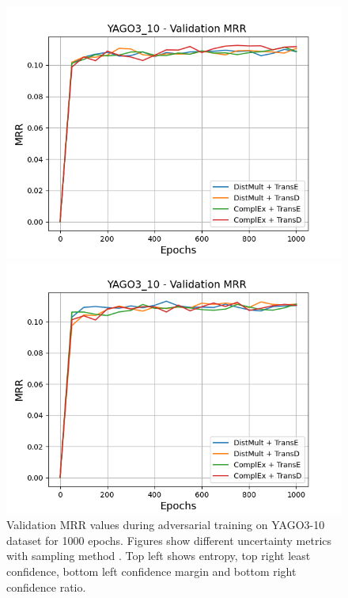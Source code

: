 \begin{figure}[H]
\begin{minipage}{.5\textwidth}
    \end{minipage}
    \begin{minipage}{.5\textwidth}
      \centering
      \includegraphics[width=0.9\linewidth]{figures/results/gan_train/not_pretrained/uncertainty/max_distribution/confidence_margin/yago3_10/uncertainty_yago3_10_mrrs.png}
    \end{minipage}%
    \begin{minipage}{.5\textwidth}
      \centering
      \includegraphics[width=0.9\linewidth]{figures/results/gan_train/not_pretrained/uncertainty/max_distribution/confidence_ratio/yago3_10/uncertainty_yago3_10_mrrs.png}
    \end{minipage}%
    \caption{Validation MRR values during adversarial training on \textsc{YAGO3-10} dataset for 1000 epochs. 
    Figures show different uncertainty metrics with sampling method  \ussoftmax.
    Top left shows entropy, top right least confidence, 
    bottom left confidence margin and bottom right confidence ratio.}
    \label{fig:advtrain_metrics_yago3_10}
\end{figure}



